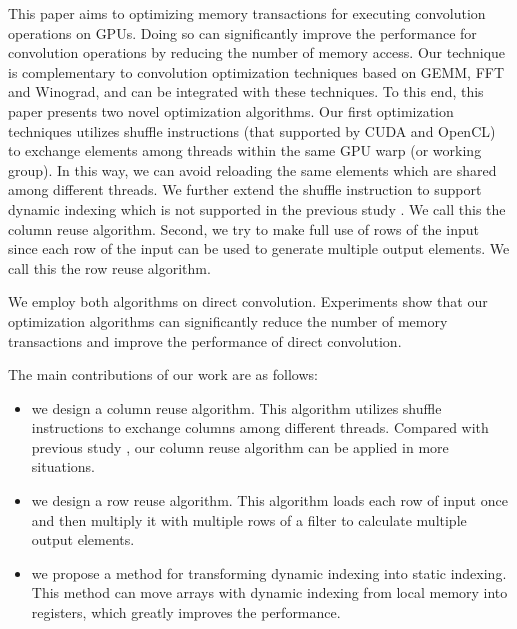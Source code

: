 This paper aims to optimizing memory transactions for executing convolution operations on GPUs. Doing so can significantly improve the
performance for convolution operations by reducing the number of memory access. Our technique is complementary to convolution optimization
techniques based on GEMM, FFT and Winograd, and can be integrated with these techniques. To this end, this paper presents two novel
optimization algorithms. Our first optimization techniques utilizes shuffle instructions (that supported by CUDA and OpenCL) to exchange
elements among threads within the same GPU warp (or working group). In this way, we can avoid reloading the same elements which are shared
among different threads. We further extend the shuffle instruction to support dynamic indexing which is not supported in the previous study
\cite{vasilache2014fast}. We call this the column reuse algorithm. Second, we try to make full use of rows of the input since each row of
the input can be used to generate multiple output elements. We call this the row reuse algorithm.

We employ both algorithms on direct convolution. Experiments show that our optimization algorithms can significantly reduce the number of
memory transactions and improve the performance of direct convolution.

The main contributions of our work are as follows:
\begin{itemize}
  \item we design a column reuse algorithm. This algorithm utilizes shuffle instructions to exchange columns among different threads. Compared
      with previous study \cite{vasilache2014fast}, our column reuse algorithm can be applied in more situations.
  \item we design a row reuse algorithm. This algorithm loads each row of input once and then multiply it with multiple rows of a filter
      to calculate multiple output elements.
  \item we propose a method for transforming dynamic indexing into static indexing. This method can move arrays with dynamic indexing
      from local memory into registers, which greatly improves the performance.
\end{itemize}
